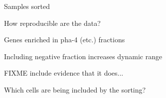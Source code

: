 \documentclass[serif,9pt]{beamer}
\begin{document}
\begin{frame}{Samples sorted}



\end{frame}

\begin{frame}{How reproducible are the data?}




\end{frame}

\begin{frame}{Genes enriched in pha-4 (etc.) fractions}




\end{frame}

\begin{frame}{Including negative fraction increases dynamic range}

FIXME include evidence that it does...


\end{frame}

\begin{frame}{Which cells are being included by the sorting?}



\end{frame}
\end{document}
